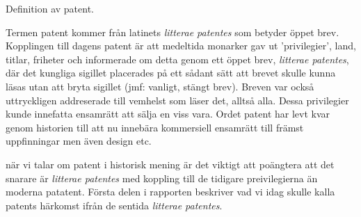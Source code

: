 Definition av patent.

Termen patent kommer från latinets \emph{litterae patentes} som betyder öppet 
brev. Kopplingen till dagens patent är att medeltida monarker gav ut
'privilegier', land, titlar, friheter och informerade om detta genom ett öppet 
brev, \emph{litterae patentes}, där det kungliga sigillet placerades på ett
sådant sätt att brevet skulle kunna läsas utan att bryta sigillet (jmf: 
vanligt, stängt brev). Breven var också uttryckligen addreserade till 
vemhelst som läser det, alltså alla. Dessa privilegier kunde innefatta ensamrätt
att sälja en viss vara. Ordet patent har levt kvar genom historien till 
att nu innebära kommersiell ensamrätt till främst uppfinningar men även 
design etc. \cite{blackstone vad hänvisas?}

när vi talar om patent i historisk mening är det viktigt att poängtera att det 
snarare är \emph{litterae patentes} med koppling till de tidigare 
preivilegierna än moderna patatent. Första delen i rapporten beskriver vad vi 
idag skulle kalla patents härkomst ifrån de sentida \emph{litterae patentes}.